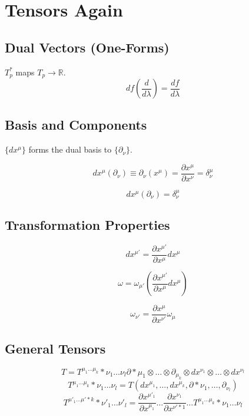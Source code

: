 \documentclass[11pt, a4paper]{report}
\begin{document}
\section{Tensors Again}
\subsection*{Dual Vectors (One-Forms)}


$T_p^*$ maps $T_p \to \mathbb{R}$.
\begin{equation} df\left(\frac{d}{d\lambda}\right) = \frac{df}{d\lambda} \end{equation}

\subsection*{Basis and Components}


$\{dx^\mu\}$ forms the dual basis to $\{\partial_\nu\}$.


$$ dx^\mu (\partial_\nu) \equiv \partial_\nu (x^\mu) = \frac{\partial x^\mu}{\partial x^\nu} = \delta^\mu_\nu $$


\begin{equation} dx^\mu (\partial_\nu) = \delta^\mu_\nu \end{equation}

\subsection*{Transformation Properties}
\begin{equation} dx^{\mu'} = \frac{\partial x^{\mu'}}{\partial x^\mu} dx^\mu \end{equation}


$$ \omega = \omega_{\mu'} \left( \frac{\partial x^{\mu'}}{\partial x^\mu} dx^\mu \right) $$


\begin{equation} \omega_{\nu'} = \frac{\partial x^\mu}{\partial x^{\nu'}} \omega_\mu \end{equation}

\subsection*{General Tensors}
\begin{equation} T = {T^{\mu_1 \dots \mu_k}}*{\nu_1 \dots \nu_l} \partial*{\mu_1} \otimes \dots \otimes \partial_{\mu_k} \otimes dx^{\nu_1} \otimes \dots \otimes dx^{\nu_l} \end{equation}
\begin{equation} {T^{\mu_1 \dots \mu_k}}*{\nu_1 \dots \nu_l} = T(dx^{\mu_1}, \dots, dx^{\mu_k}, \partial*{\nu_1}, \dots, \partial_{\nu_l}) \end{equation}
\begin{equation} {T^{\mu'_1 \dots \mu'*k}}*{\nu'_1 \dots \nu'_l} = \frac{\partial x^{\mu'_1}}{\partial x^{\mu_1}} \dots \frac{\partial x^{\nu_1}}{\partial x^{\nu'*1}} \dots {T^{\mu_1 \dots \mu_k}}*{\nu_1 \dots \nu_l} \end{equation}
\end{document}
